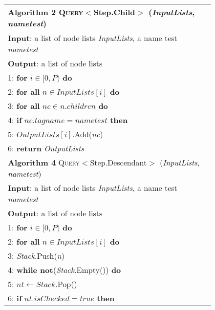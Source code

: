 	

\begin{figure}[t]
	\centering
	\label{fig:algQueryChild}
	\begin{tabular}{l}
		\hline
		\textbf{Algorithm 2} \textsc{Query}$<$Step.Child$>$ (\emph{InputLists}, \emph{nametest}) \\
		\hline
		\textbf{Input}: a list of node lists \emph{InputLists}, a name test \emph{nametest} \\
		\textbf{Output}: a list of node lists  \\
		1: \hspace{1 mm} \textbf{for} $i \in [0, P)$ \textbf{do} \\
		2: \hspace{4 mm} \textbf{for all} $n \in InputLists[i]$ \textbf{do} \\
		3: \hspace{8 mm} \textbf{for all} $nc \in n.children$ \textbf{do} \\
		4: \hspace{12 mm} \textbf{if} $nc.tagname = nametest$ \textbf{then}  \\
		5: \hspace{16 mm} $OutputLists[i]$.Add(\emph{nc})   \\
		6: \hspace{1 mm} \textbf{return} \emph{OutputLists} \\
		\hline
		\textbf{Algorithm 4} \textsc{Query}$<$Step.Descendant$>$ (\emph{InputLists}, \emph{nametest}) \\
		\hline
		\textbf{Input}: a list of node lists \emph{InputLists}, a name test \emph{nametest} \\
		\textbf{Output}: a list of node lists  \\
		1: \hspace{1 mm} \textbf{for} $i \in [0, P)$ \textbf{do} \\
		2: \hspace{4 mm} \textbf{for all} $n \in InputLists[i]$ \textbf{do} \\
		3: \hspace{8 mm} \emph{Stack}.Push(\emph{n}) \\
		4: \hspace{8 mm} \textbf{while not}(\emph{Stack}.Empty()) \textbf{do}  \\
		5: \hspace{12 mm} $nt \leftarrow Stack$.Pop()  \\
		6: \hspace{12 mm} \textbf{if} $nt.isChecked = true$ \textbf{then} \\

\end{tabular}
\end{figure}
